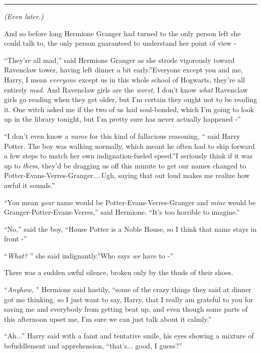 \begin{center}\rule{3in}{0.4pt}\end{center}

\emph{(Even later.)}

And so before long Hermione Granger had turned to the only person left
she could talk to, the only person guaranteed to understand her point of
view -

``They're all mad,'' said Hermione Granger as she strode vigorously
toward Ravenclaw tower, having left dinner a bit early.''Everyone except
you and me, Harry, I mean \emph{everyone} except us in this whole school
of Hogwarts, they're all entirely \emph{mad.} And Ravenclaw girls are
the \emph{worst,} I don't know \emph{what} Ravenclaw girls go reading
when they get older, but I'm certain they ought not to be reading it.
One witch asked me if the two of us had soul-bonded, which I'm going to
look up in the library tonight, but I'm pretty sure has never actually
happened -''

``I don't even know a \emph{name} for this kind of fallacious reasoning,
`` said Harry Potter. The boy was walking normally, which meant he often
had to skip forward a few steps to match her own indignation-fueled
speed.''I seriously think if it was up to \emph{them}, they'd be
dragging us off this minute to get our names changed to
Potter-Evans-Verres-Granger... Ugh, saying that out loud makes me
realize how awful it sounds.''

``You mean \emph{your} name would be Potter-Evans-Verres-Granger and
\emph{mine} would be Granger-Potter-Evans-Verres,'' said Hermione.
``It's too horrible to imagine.''

``No,'' said the boy, ``House Potter is a Noble House, so I think that
name stays in front -''

``\emph{What?} '' she said indignantly.''Who says \emph{we} have to -''

There was a sudden awful silence, broken only by the thuds of their
shoes.

``\emph{Anyhow,} '' Hermione said hastily, ``some of the crazy things they
said at dinner got me thinking, so I just want to say, Harry, that I
really am grateful to you for saving me and everybody from getting beat
up, and even though some parts of this afternoon upset me, I'm sure we
can just talk about it calmly.''

``Ah...'' Harry said with a faint and tentative smile, his eyes
showing a mixture of befuddlement and apprehension, ``that's...
good, I guess?''

